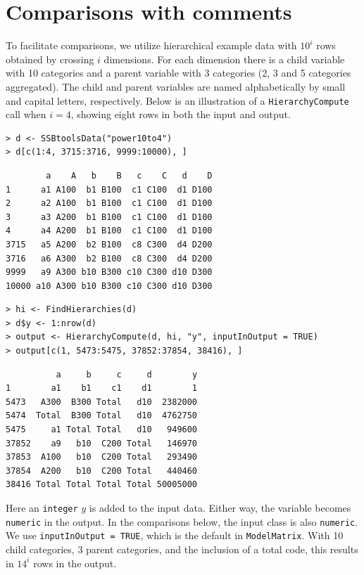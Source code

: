 \hypertarget{comparisons-with-comments}{%
\section{Comparisons with comments}\label{comparisons-with-comments}}

To facilitate comparisons, we utilize hierarchical example data with \(10^i\) rows obtained by crossing \(i\) dimensions.
For each dimension there is a child variable with 10 categories and a parent variable with 3 categories (2, 3 and 5 categories aggregated).
The child and parent variables are named alphabetically by small and capital letters, respectively.
Below is an illustration of a \texttt{HierarchyCompute} call when \(i = 4\), showing eight rows in both the input and output.

\begin{verbatim}
> d <- SSBtoolsData("power10to4")
> d[c(1:4, 3715:3716, 9999:10000), ]
\end{verbatim}

\begin{verbatim}
        a    A   b    B   c    C   d    D
1      a1 A100  b1 B100  c1 C100  d1 D100
2      a2 A100  b1 B100  c1 C100  d1 D100
3      a3 A200  b1 B100  c1 C100  d1 D100
4      a4 A200  b1 B100  c1 C100  d1 D100
3715   a5 A200  b2 B100  c8 C300  d4 D200
3716   a6 A300  b2 B100  c8 C300  d4 D200
9999   a9 A300 b10 B300 c10 C300 d10 D300
10000 a10 A300 b10 B300 c10 C300 d10 D300
\end{verbatim}

\begin{verbatim}
> hi <- FindHierarchies(d)
> d$y <- 1:nrow(d)
> output <- HierarchyCompute(d, hi, "y", inputInOutput = TRUE)
> output[c(1, 5473:5475, 37852:37854, 38416), ]
\end{verbatim}

\begin{verbatim}
          a     b     c     d        y
1        a1    b1    c1    d1        1
5473   A300  B300 Total   d10  2382000
5474  Total  B300 Total   d10  4762750
5475     a1 Total Total   d10   949600
37852    a9   b10  C200 Total   146970
37853  A100   b10  C200 Total   293490
37854  A200   b10  C200 Total   440460
38416 Total Total Total Total 50005000
\end{verbatim}

Here an \texttt{integer} \(y\) is added to the input data. Either way, the variable becomes \texttt{numeric} in the output.
In the comparisons below, the input class is also \texttt{numeric}.
We use \texttt{inputInOutput\ =\ TRUE}, which is the default in \texttt{ModelMatrix}.
With 10 child categories, 3 parent categories, and the inclusion of a total code, this results in \(14^i\) rows in the output.

